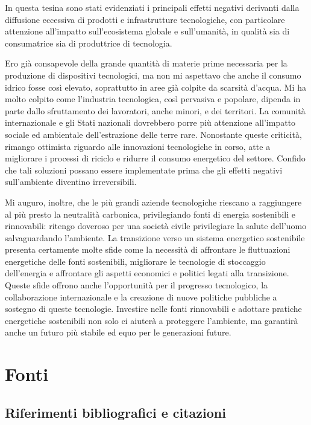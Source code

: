 \documentclass[12pt,a4paper,oneside]{book}
\begin{document}
In questa tesina sono stati evidenziati i principali effetti negativi derivanti dalla diffusione eccessiva di prodotti e infrastrutture tecnologiche, con particolare attenzione all'impatto sull'ecosistema globale e sull'umanità, in qualità sia di consumatrice sia di produttrice di tecnologia.

Ero già consapevole della grande quantità di materie prime necessaria per la produzione di dispositivi tecnologici, ma non mi aspettavo che anche il consumo idrico fosse così elevato, soprattutto in aree già colpite da scarsità d'acqua.
Mi ha molto colpito come l'industria tecnologica, così pervasiva e popolare, dipenda in parte dallo sfruttamento dei lavoratori, anche minori, e dei territori. La comunità internazionale e gli Stati nazionali dovrebbero porre più attenzione all'impatto sociale ed ambientale dell'estrazione delle terre rare.
Nonostante queste criticità, rimango ottimista riguardo alle innovazioni tecnologiche in corso, atte a migliorare i processi di riciclo e ridurre il consumo energetico del settore. Confido che tali soluzioni possano essere implementate prima che gli effetti negativi sull'ambiente diventino irreversibili.

Mi auguro, inoltre, che le più grandi aziende tecnologiche riescano a raggiungere al più presto la neutralità carbonica, privilegiando fonti di energia sostenibili e rinnovabili: ritengo doveroso per una società civile privilegiare la salute dell'uomo salvaguardando l'ambiente. La transizione verso un sistema energetico sostenibile presenta certamente molte sfide come la necessità di affrontare le fluttuazioni energetiche delle fonti sostenibili, migliorare le tecnologie di stoccaggio dell'energia e affrontare gli aspetti economici e politici legati alla transizione.
Queste sfide offrono anche l'opportunità per il progresso tecnologico, la collaborazione internazionale e la creazione di nuove politiche pubbliche a sostegno di queste tecnologie. Investire nelle fonti rinnovabili e adottare pratiche energetiche sostenibili non solo ci aiuterà a proteggere l'ambiente, ma garantirà anche un futuro più stabile ed equo per le generazioni future.

\newpage

\chapter*{Fonti}
\renewcommand{\bibsection}{}
\section*{Riferimenti bibliografici e citazioni}
\nocite{*}
\end{document}
